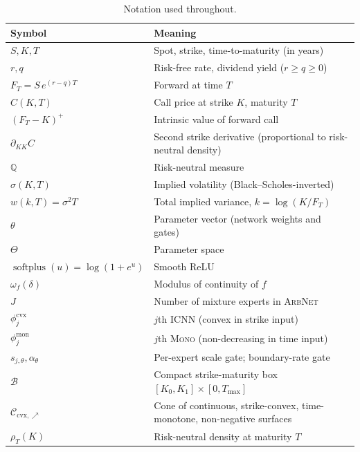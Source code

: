 \documentclass[largeformat]{interact}
\theoremstyle{plain}
\theoremstyle{definition}
\newcommand{\Qm}{\mathbb{Q}}
\DeclareMathOperator{\softplus}{softplus}
\newcommand{\arbnet}{\textsc{ArbNet}}
\newcommand{\icnn}{\textsc{ICNN}}
\newcommand{\mononet}{\textsc{Mono}}
\newcommand{\bs}{Black--Scholes}
\begin{document}
\begin{table}[h]
\centering
\caption{Notation used throughout.}
\label{tab:notation}
\begin{tabular}{l p{}}
\toprule
Symbol & Meaning \\
\midrule
$S, K, T$               & Spot, strike, time-to-maturity (in years) \\
$r, q$                  & Risk-free rate, dividend yield ($r \geq q \geq 0$) \\
$F_T = S\,e^{(r-q)T}$   & Forward at time $T$ \\
$C(K, T)$               & Call price at strike $K$, maturity $T$ \\
$(F_T - K)^+$           & Intrinsic value of forward call \\
$\partial_{KK} C$       & Second strike derivative (proportional to risk-neutral density) \\
$\Qm$                   & Risk-neutral measure \\
$\sigma(K, T)$          & Implied volatility (\bs{}-inverted) \\
$w(k, T) = \sigma^2 T$  & Total implied variance, $k = \log(K/F_T)$ \\
$\theta$                & Parameter vector (network weights and gates) \\
$\Theta$                & Parameter space \\
$\softplus(u) = \log(1+e^u)$ & Smooth ReLU \\
$\omega_f(\delta)$      & Modulus of continuity of $f$ \\
$J$                     & Number of mixture experts in \arbnet{} \\
$\phi^{\mathrm{cvx}}_j$ & $j$th \icnn{} (convex in strike input) \\
$\phi^{\mathrm{mon}}_j$ & $j$th \mononet{} (non-decreasing in time input) \\
$s_{j,\theta},\alpha_\theta$ & Per-expert scale gate; boundary-rate gate \\
$\mathcal{B}$           & Compact strike-maturity box $[K_0, K_1] \times [0, T_{\max}]$ \\
$\mathcal{C}_{\mathrm{cvx},\nearrow}$ & Cone of continuous, strike-convex, time-monotone, non-negative surfaces \\
$\rho_T(K)$             & Risk-neutral density at maturity $T$ \\
\bottomrule
\end{tabular}
\end{table}
\end{document}
